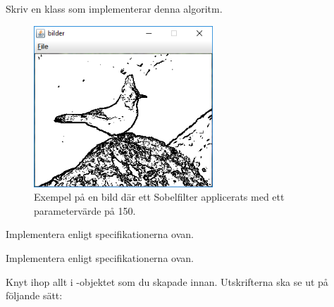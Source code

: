Skriv en klass  som implementerar denna algoritm.

\begin{figure}[H]
\begin{center}
\includegraphics[width=0.6\textwidth]{../img/w13-assignment-imageprocessing/sobeljay.png}
\caption { Exempel på en bild där ett Sobelfilter applicerats med ett parametervärde på 150.}
\label{fig:imageprocessing:sobelfilter:sobel}
\end{center}
\end{figure}


\Task Implementera  enligt specifikationerna ovan.

\Task Implementera  enligt specifikationerna ovan.

\Task Knyt ihop allt i -objektet som du skapade innan. Utskrifterna ska se ut på följande sätt:

